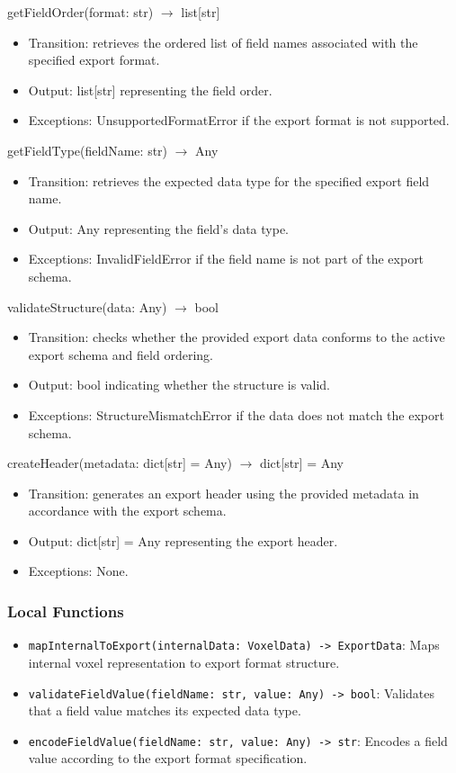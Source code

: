 \documentclass[12pt, titlepage]{article}
\begin{document}
getFieldOrder(format: str) $\rightarrow$ list[str]
\begin{itemize}
  \item Transition: retrieves the ordered list of field names associated with the specified export format.
  \item Output: list[str] representing the field order.
  \item Exceptions: UnsupportedFormatError if the export format is not supported.
\end{itemize}

getFieldType(fieldName: str) $\rightarrow$ Any
\begin{itemize}
  \item Transition: retrieves the expected data type for the specified export field name.
  \item Output: Any representing the field’s data type.
  \item Exceptions: InvalidFieldError if the field name is not part of the export schema.
\end{itemize}

validateStructure(data: Any) $\rightarrow$ bool
\begin{itemize}
  \item Transition: checks whether the provided export data conforms to the active export schema and field ordering.
  \item Output: bool indicating whether the structure is valid.
  \item Exceptions: StructureMismatchError if the data does not match the export schema.
\end{itemize}

createHeader(metadata: dict[str] = Any) $\rightarrow$ dict[str] = Any
\begin{itemize}
  \item Transition: generates an export header using the provided metadata in accordance with the export schema.
  \item Output: dict[str] = Any representing the export header.
  \item Exceptions: None.
\end{itemize}


\subsubsection{Local Functions}
\begin{itemize}
  \item \texttt{mapInternalToExport(internalData: VoxelData) -> ExportData}: Maps internal voxel representation to export format structure.
  \item \texttt{validateFieldValue(fieldName: str, value: Any) -> bool}: Validates that a field value matches its expected data type.
  \item \texttt{encodeFieldValue(fieldName: str, value: Any) -> str}: Encodes a field value according to the export format specification.
\end{itemize}
\end{document}
